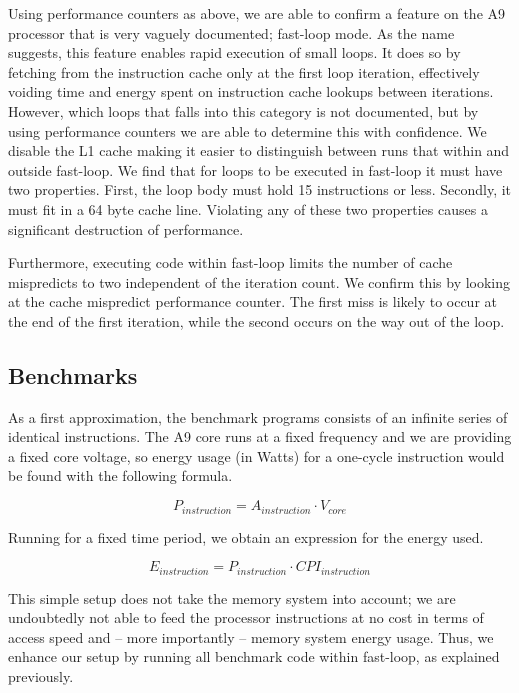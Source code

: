 Using performance counters as above, we are able to confirm a feature on the A9
processor that is very vaguely documented; fast-loop\texttrademark{} mode. As
the name suggests, this feature enables rapid execution of small loops. It does
so by fetching from the instruction cache only at the first loop iteration,
effectively voiding time and energy spent on instruction cache lookups between
iterations. However, which loops that falls into this category is not
documented, but by using performance counters we are able to determine this with
confidence. We disable the L1 cache making it easier to distinguish between runs
that within and outside fast-loop. We find that for loops to be executed in
fast-loop it must have two properties. First, the loop body must hold 15
instructions or less. Secondly, it must fit in a 64 byte cache line. Violating
any of these two properties causes a significant destruction of performance.

Furthermore, executing code within fast-loop limits the number of cache
mispredicts to two independent of the iteration count. We confirm this by
looking at the cache mispredict performance counter. The first miss is likely to
occur at the end of the first iteration, while the second occurs on the way out
of the loop.

\subsection{Benchmarks}
As a first approximation, the benchmark programs consists of an infinite series
of identical instructions. The A9 core runs at a fixed frequency and we are
providing a fixed core voltage, so energy usage (in Watts) for a one-cycle
instruction would be found with the following formula.

\begin{equation}
    P_{instruction} = A_{instruction} \cdot V_{core}
\end{equation}

Running for a fixed time period, we obtain an expression for the energy used.

\begin{equation}
    E_{instruction} = P_{instruction} \cdot CPI_{instruction}
\end{equation}

This simple setup does not take the memory system into account; we are
undoubtedly not able to feed the processor instructions at no cost in terms of
access speed and -- more importantly -- memory system energy usage. Thus, we
enhance our setup by running all benchmark code within fast-loop, as explained
previously.

